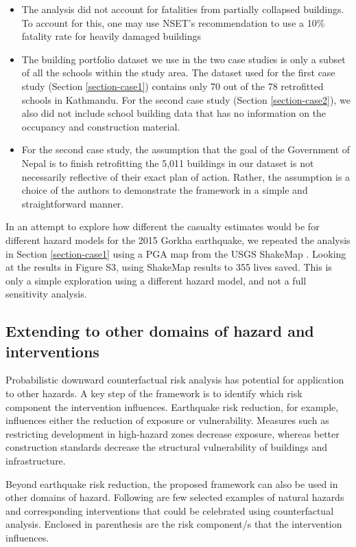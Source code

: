 \documentclass[utf8]{frontiersSCNS} %
\begin{document}
\begin{itemize}
    \item 
    The analysis did not account for fatalities from partially collapsed buildings. To account for this, one may use NSET's recommendation to use a 10\% fatality rate for heavily damaged buildings \citep{nset2000}
    \item
    The building portfolio dataset we use in the two case studies is only a subset of all the schools within the study area. The dataset used for the first case study (Section \ref{section-case1}) contains only 70 out of the 78 retrofitted schools in Kathmandu. For the second case study (Section \ref{section-case2}), we also did not include school building data that has no information on the occupancy and construction material.
    \item
    For the second case study, the assumption that the goal of the Government of Nepal is to finish retrofitting the 5,011 buildings in our dataset is not necessarily reflective of their exact plan of action. Rather, the assumption is a choice of the authors to demonstrate the framework in a simple and straightforward manner.
\end{itemize}

In an attempt to explore how different the casualty estimates would be for different hazard models for the 2015 Gorkha earthquake, we repeated the analysis in Section \ref{section-case1} using a PGA map from the USGS ShakeMap \citep{wald2007topographic}. Looking at the results in Figure S3, using ShakeMap results to 355 lives saved. This is only a simple exploration using a different hazard model, and not a full sensitivity analysis.

\subsection{Extending to other domains of hazard and interventions}

Probabilistic downward counterfactual risk analysis has potential for application to other hazards. A key step of the framework is to identify which risk component the intervention influences. Earthquake risk reduction, for example, influences either the reduction of exposure or vulnerability. Measures such as restricting development in high-hazard zones decrease exposure, whereas better construction standards decrease the structural vulnerability of buildings and infrastructure.

Beyond earthquake risk reduction, the proposed framework can also be used in other domains of hazard. Following are few selected examples of natural hazards and corresponding interventions that could be celebrated using counterfactual analysis. Enclosed in parenthesis are the risk component/s that the intervention influences.
\end{document}

